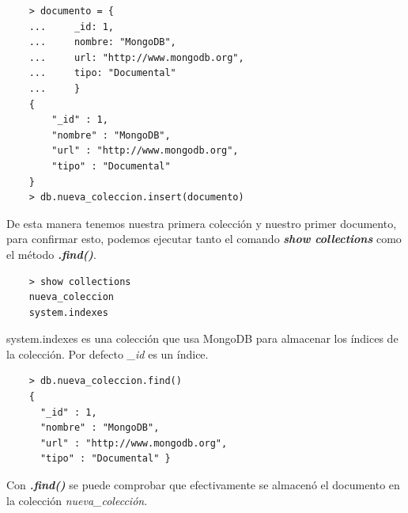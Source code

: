 \begin{lstlisting}
    > documento = {
    ...     _id: 1,
    ...     nombre: "MongoDB",
    ...     url: "http://www.mongodb.org",
    ...     tipo: "Documental"
    ...     }
    {
    	"_id" : 1,
    	"nombre" : "MongoDB",
    	"url" : "http://www.mongodb.org",
    	"tipo" : "Documental"
    }
    > db.nueva_coleccion.insert(documento)
\end{lstlisting}

De esta manera tenemos nuestra primera colecci\'on y nuestro primer documento, para confirmar esto, podemos ejecutar tanto el comando \textit{\textbf{show collections}} como el m\'etodo \textit{\textbf{.find()}}.

\begin{lstlisting}
    > show collections
    nueva_coleccion
    system.indexes
\end{lstlisting}

system.indexes es una colecci\'on que usa MongoDB para almacenar los \'indices de la colecci\'on. Por defecto \textit{\_id} es un \'indice.

\begin{lstlisting}
    > db.nueva_coleccion.find()
    { 
      "_id" : 1,
      "nombre" : "MongoDB",
      "url" : "http://www.mongodb.org",
      "tipo" : "Documental" }
\end{lstlisting}

Con \textit{\textbf{.find()}} se puede comprobar que efectivamente se almacen\'o el documento en la colecci\'on \textit{nueva\_colecci\'on}.